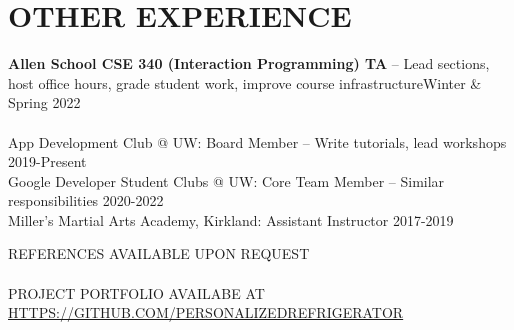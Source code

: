 \documentclass[12pt,letterpaper]{extarticle}
\begin{document}
  \section{OTHER EXPERIENCE}
  \textbf{Allen School CSE 340 (Interaction Programming) TA} -- {\footnotesize Lead sections, host office hours, grade student work, improve course infrastructure}\hfill \small Winter \& Spring 2022\\\;\\
  App Development Club @ UW: Board Member -- {\footnotesize Write tutorials, lead workshops} \hfill 2019-Present\\
  Google Developer Student Clubs @ UW: Core Team Member -- {\footnotesize Similar responsibilities} \hfill 2020-2022\\
  Miller's Martial Arts Academy, Kirkland: Assistant Instructor \hfill 2017-2019

  \begin{center}
    REFERENCES AVAILABLE UPON REQUEST\\\phantom{;}\\
    PROJECT PORTFOLIO AVAILABE AT \url{HTTPS://GITHUB.COM/PERSONALIZEDREFRIGERATOR}
  \end{center}
\end{document}
